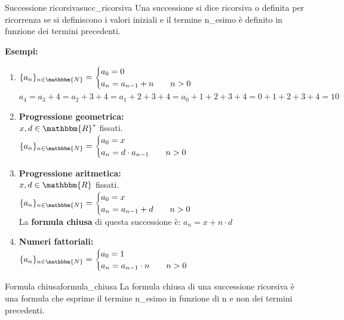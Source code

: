\documentclass[12pt, letterpaper]{report}
\newcounter{definition}
\newcommand{\nmu}{}
\begin{document}
 		\begin{definition}{\nmu Successione ricorsiva}{succ_ricorsiva}
 			Una successione si dice ricorsiva o definita per ricorrenza se si definiscono i valori iniziali e il termine n\_esimo è definito in funzione dei termini precedenti.
 		\end{definition}
 		\textbf{Esempi:}
 		\begin{enumerate}
 			\item $\{a_n\}_{n \in \mathbbm{N}} = \begin{cases}
 				a_0 = 0 \\
 				a_n = a_{n - 1} + n \hspace{0.7cm} n > 0
 			\end{cases}$
 			\\
 			$a_4 = a_3 + 4 = a_2 + 3 + 4 = a_1 + 2 + 3 + 4 = a_0 + 1 + 2 + 3 + 4 = 0 + 1 + 2 + 3 + 4 = 10$
 			\item \textbf{Progressione geometrica:} \\
 			$x,d \in \mathbbm{R}^*$ fissati.
 			\\
 			$\{a_n\}_{n \in \mathbbm{N}} = \begin{cases}
 				a_0 = x \\
 				a_n = d \cdot a_{n - 1} \hspace{0.7cm} n > 0
 			\end{cases}$
 			\item \textbf{Progressione aritmetica:} \\
 			$x,d \in \mathbbm{R}$ fissati.
 			\\
 			$\{a_n\}_{n \in \mathbbm{N}} = \begin{cases}
 				a_0 = x \\
 				a_n = a_{n - 1} + d \hspace{0.7cm} n > 0
 			\end{cases}$
 			\\
 			La \textbf{formula chiusa} di questa successione è: $a_n = x + n \cdot d$
 			\item \textbf{Numeri fattoriali: } \\
 			 $\{a_n\}_{n \in \mathbbm{N}} = \begin{cases}
 				a_0 = 1 \\
 				a_n = a_{n - 1} \cdot n \hspace{0.7cm} n > 0
 			\end{cases}$
 		\end{enumerate}
 		 \begin{definition}{\nmu Formula chiusa}{formula_chiusa}
 			La formula chiusa di una successione ricorsiva è una formula che esprime il termine n\_esimo in funzione di n e non dei termini precedenti.
 		\end{definition}
\end{document}
